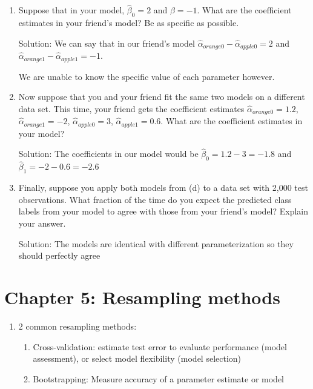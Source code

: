 \documentclass{article}
\begin{document}
\begin{enumerate}
\begin{enumerate}
Solution: From 4.14, log odds of our friend's model is:

$$
(\hat\alpha_{orange0} - \hat\alpha_{apple0}) + (\hat\alpha_{orange1} - \hat\alpha_{apple1})x
$$

\item Suppose that in your model, $\hat\beta_0 = 2$ and $\hat\beta = -1$. What
    are the coefficient estimates in your friend's model? Be as specific as
    possible.

Solution: We can say that in our friend's model $\hat\alpha_{orange0} -
\hat\alpha_{apple0} = 2$ and $\hat\alpha_{orange1} - \hat\alpha_{apple1} = -1$.

We are unable to know the specific value of each parameter however.

\item Now suppose that you and your friend fit the same two models on a different
    data set. This time, your friend gets the coefficient estimates 
    $\hat\alpha_{orange0} = 1.2$, $\hat\alpha_{orange1} = -2$, 
    $\hat\alpha_{apple0} = 3$, $\hat\alpha_{apple1} = 0.6$. What are the 
    coefficient estimates in your model?

Solution: The coefficients in our model would be $\hat\beta_0 = 1.2 - 3 = -1.8$ and
$\hat\beta_1 = -2 - 0.6 = -2.6$

\item Finally, suppose you apply both models from (d) to a data set with 2,000
    test observations. What fraction of the time do you expect the predicted 
    class labels from your model to agree with those from your friend's model?
    Explain your answer.

Solution: The models are identical with different parameterization so they should 
perfectly agree
\end{enumerate}
\end{enumerate}

\section*{Chapter 5: Resampling methods} 

\begin{enumerate}
\item 2 common resampling methods: 
\begin{enumerate}
\item Cross-validation: estimate test error to evaluate performance (model assessment), or select model flexibility (model selection)
\item Bootstrapping: Measure accuracy of a parameter estimate or model
\end{enumerate}

\end{enumerate}
\end{document}
